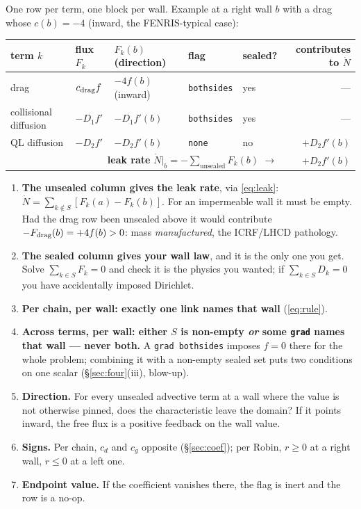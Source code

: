 \documentclass[10pt]{article}
\newcommand{\code}[1]{\texttt{#1}}
\begin{document}
One row per term, one block per wall. Example at a right wall $b$ with a drag
whose $c(b)=-4$ (inward, the FENRIS-typical case):
\begin{center}\small
\begin{tabular}{@{}lllllr@{}}
\toprule
term $k$ & flux $F_k$ & $F_k(b)$ (direction) & flag & sealed? & contributes to $\dot N$ \\
\midrule
drag & $c_{\rm drag}f$ & $-4f(b)$ (inward) & \code{bothsides} & yes & --- \\
collisional diffusion & $-D_1f'$ & $-D_1f'(b)$ & \code{bothsides} & yes & --- \\
QL diffusion & $-D_2f'$ & $-D_2f'(b)$ & \code{none} & no & $+D_2f'(b)$ \\
\midrule
\multicolumn{5}{r}{\textbf{leak rate} $\dot N|_b=-\sum_{\text{unsealed}}F_k(b)$ $\rightarrow$} & $+D_2f'(b)$ \\
\bottomrule
\end{tabular}
\end{center}
\begin{enumerate}\itemsep0pt
\item \textbf{The unsealed column gives the leak rate}, via \eqref{eq:leak}:
$\dot N=\sum_{k\notin S}[F_k(a)-F_k(b)]$. For an impermeable wall it must be
empty. Had the drag row been unsealed above it would contribute
$-F_{\rm drag}(b)=+4f(b)>0$: mass \emph{manufactured}, the ICRF/LHCD pathology.
\item \textbf{The sealed column gives your wall law}, and it is the only one you
get. Solve $\sum_{k\in S}F_k=0$ and check it is the physics you wanted; if
$\sum_{k\in S}D_k=0$ you have accidentally imposed Dirichlet.
\item \textbf{Per chain, per wall: exactly one link names that wall}
(\eqref{eq:rule}).
\item \textbf{Across terms, per wall: either $S$ is non-empty \emph{or} some
\code{grad} names that wall --- never both.} A \code{grad bothsides} imposes
$f=0$ there for the whole problem; combining it with a non-empty sealed set puts
two conditions on one scalar (\S\ref{sec:four}(iii), blow-up).
\item \textbf{Direction.} For every unsealed advective term at a wall where the
value is not otherwise pinned, does the characteristic leave the domain? If it
points inward, the free flux is a positive feedback on the wall value.
\item \textbf{Signs.} Per chain, $c_d$ and $c_g$ opposite (\S\ref{sec:coef}); per
Robin, $r\ge0$ at a right wall, $r\le0$ at a left one.
\item \textbf{Endpoint value.} If the coefficient vanishes there, the flag is
inert and the row is a no-op.
\end{enumerate}
\end{document}
